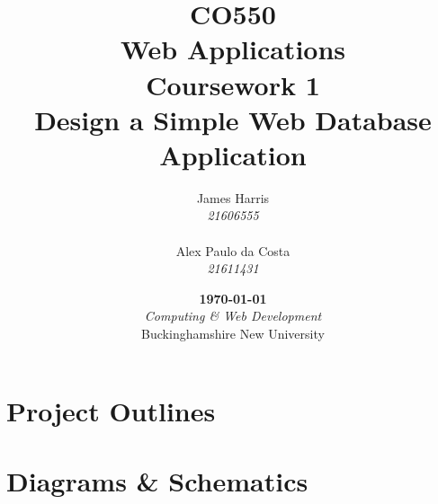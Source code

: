 \documentclass{report}
\title{
    \fontspec[Path=.fonts/]{LibertineDisplay}
    \Large CO550\\
    Web Applications\\
    Coursework 1\vspace*{.65cm}\\
    \huge Design a Simple Web Database Application\vfill
}
\author{
    James Harris\\
    \textit{21606555}\\
    \hfill\\
    Alex Paulo da Costa\\
    \textit{21611431}
}
\date{
    \vfill\textbf{\today}\\
    \vspace*{.75cm}\textit{Computing \& Web Development}\\
    Buckinghamshire New University
}
\begin{document}
\maketitle

\tableofcontents

\chapter{Project Outlines}





\chapter{Diagrams \& Schematics}



\end{document}
